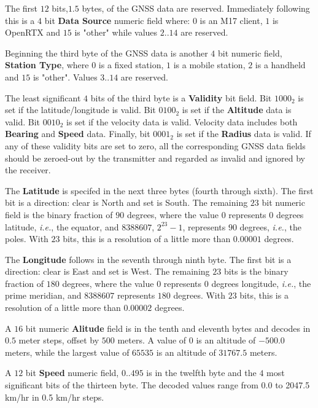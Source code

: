 \documentclass[a4paper,11pt,oneside]{book}
\begin{document}
The first $12$ bits,$1.5$ bytes, of the GNSS data are reserved. Immediately following this is a $4$ bit \textbf{Data Source} numeric field where: $0$ is an M17 client, $1$ is OpenRTX and $15$ is "other" while values $2..14$ are reserved.

Beginning the third byte of the GNSS data is another $4$ bit numeric field, \textbf{Station Type}, where $0$ is a fixed station, $1$ is a mobile station, $2$ is a handheld and $15$ is "other". Values $3..14$ are reserved. 

The least significant $4$ bits of the third byte is a \textbf{Validity} bit field. Bit $1000_2$ is set if the latitude/longitude is valid. Bit $0100_2$ is set if the \textbf{Altitude} data is valid. Bit $0010_2$ is set if the velocity data is valid. Velocity data includes both \textbf{Bearing} and \textbf{Speed} data. Finally, bit $0001_2$ is set if the \textbf{Radius} data is valid. If any of these validity bits are set to zero, all the corresponding GNSS data fields should be zeroed-out by the transmitter and regarded as invalid and ignored by the receiver.

The \textbf{Latitude} is specifed in the next three bytes (fourth through sixth). The first bit is a direction: clear is North and set is South. The remaining $23$ bit numeric field is the binary fraction of $90$ degrees, where the value $0$ represents $0$ degrees latitude, \textit{i.e.}, the equator, and $8388607$, $2^{23}-1$, represents $90$ degrees, \textit{i.e.}, the poles. With $23$ bits, this is a resolution of a little more than $0.00001$ degrees.

The \textbf{Longitude} follows in the seventh through ninth byte. The first bit is a direction: clear is East and set is West. The remaining $23$ bits is the binary fraction of $180$ degrees, where the value $0$ represents $0$ degrees longitude, \textit{i.e.}, the prime meridian, and $8388607$ represents $180$ degrees. With $23$ bits, this is a resolution of a little more than $0.00002$ degrees.

A $16$ bit numeric \textbf{Alitude} field is in the tenth and eleventh bytes and decodes in $0.5$ meter steps, offset by $500$ meters. A value of $0$ is an altitude of $-500.0$ meters, while the largest value of $65535$ is an altitude of $31767.5$ meters.

A $12$ bit \textbf{Speed} numeric field, $0..495$ is in the twelfth byte and the $4$ most significant bits of the thirteen byte. The decoded values range from 0.0 to 2047.5 km/hr in 0.5 km/hr steps.
\end{document}
